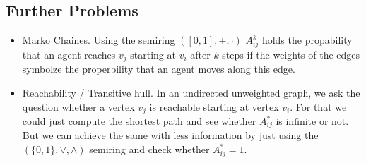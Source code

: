 \subsection{Further Problems}
\begin{itemize}
    \item Marko Chaines. Using the semiring $([0, 1], +, \cdot)$ $A^k_{ij}$ holds the propability that an agent reaches $v_j$ starting at $v_i$ after $k$ steps if the weights of the edges symbolze the properbility that an agent moves along this edge.
    \item Reachability / Transitive hull. In an undirected unweighted graph, we ask the question whether a vertex $v_j$ is reachable starting at vertex $v_i$. For that we could just compute the shortest path and see whether $A^*_{ij}$ is infinite or not. But we can achieve the same with less information by just using the $(\{0, 1\}, \lor, \land)$ semiring and check whether $A^*_{ij} = 1$.
\end{itemize}